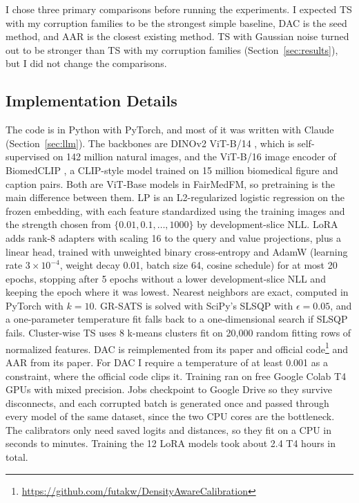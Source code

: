 \documentclass[sigconf,nonacm]{acmart}
\begin{document}
I chose three primary comparisons before running the experiments. I expected TS with my corruption families to be the strongest simple baseline, DAC is the seed method, and AAR is the closest existing method. TS with Gaussian noise turned out to be stronger than TS with my corruption families (Section~\ref{sec:results}), but I did not change the comparisons.

\subsection{Implementation Details}

The code is in Python with PyTorch, and most of it was written with Claude (Section~\ref{sec:llm}). The backbones are DINOv2 ViT-B/14 \cite{oquab2024dinov2}, which is self-supervised on 142 million natural images, and the ViT-B/16 image encoder of BiomedCLIP \cite{zhang2025biomedclip}, a CLIP-style model \cite{radford2021clip} trained on 15 million biomedical figure and caption pairs. Both are ViT-Base models \cite{dosovitskiy2021vit} in FairMedFM, so pretraining is the main difference between them. LP is an L2-regularized logistic regression on the frozen embedding, with each feature standardized using the training images and the strength chosen from $\{0.01, 0.1, \dots, 1000\}$ by development-slice NLL. LoRA \cite{hu2022lora} adds rank-8 adapters with scaling 16 to the query and value projections, plus a linear head, trained with unweighted binary cross-entropy and AdamW (learning rate $3 \times 10^{-4}$, weight decay 0.01, batch size 64, cosine schedule) for at most 20 epochs, stopping after 5 epochs without a lower development-slice NLL and keeping the epoch where it was lowest. Nearest neighbors are exact, computed in PyTorch with $k = 10$. GR-SATS is solved with SciPy's SLSQP with $\epsilon = 0.05$, and a one-parameter temperature fit falls back to a one-dimensional search if SLSQP fails. Cluster-wise TS uses 8 k-means clusters fit on 20,000 random fitting rows of normalized features. DAC is reimplemented from its paper and official code\footnote{\url{https://github.com/futakw/DensityAwareCalibration}} and AAR from its paper. For DAC I require a temperature of at least 0.001 as a constraint, where the official code clips it. Training ran on free Google Colab T4 GPUs with mixed precision. Jobs checkpoint to Google Drive so they survive disconnects, and each corrupted batch is generated once and passed through every model of the same dataset, since the two CPU cores are the bottleneck. The calibrators only need saved logits and distances, so they fit on a CPU in seconds to minutes. Training the 12 LoRA models took about 2.4 T4 hours in total.
\end{document}
